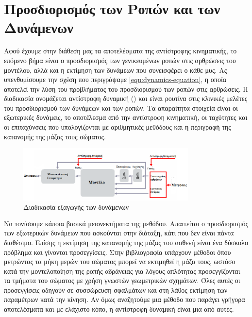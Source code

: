 \section{Προσδιορισμός των Ροπών και των Δυνάμενων}

Αφού έχουμε στην διάθεση μας τα αποτελέσματα της αντίστροφης κινηματικής, το επόμενο βήμα είναι ο προσδιορισμός των γενικευμένων ροπών στις αρθρώσεις του μοντέλου, αλλά και η εκτίμηση των δυνάμεων που συνεισφέρει ο κάθε μυς. Ας υπενθυμίσουμε την σχέση που περιγράψαμε \ref{equ:dynamics-equation}, η οποία αποτελεί την λύση του προβλήματος του προσδιορισμού των ροπών στις αρθρώσεις. Η διαδικασία ονομάζεται αντίστροφη δυναμική () και είναι ρουτίνα στις κλινικές μελέτες του προσδιορισμού των δυνάμεων και των ροπών. Τα απαραίτητα στοιχεία είναι οι εξωτερικές δυνάμεις, το αποτέλεσμα από την αντίστροφη κινηματική, οι ταχύτητες και οι επιταχύνσεις που υπολογίζονται με αριθμητικές μεθόδους και η περιγραφή της κατανομής της μάζας τους σώματος.

\begin{figure}[H]
    \centering
    \includegraphics[width=0.8\textwidth, keepaspectratio]{fig/process.png}
    \caption{Διαδικασία εξαγωγής των δυνάμενων\protect\footnotemark}
    \label{fig:methods-process1}
\end{figure}

Να τονίσουμε κάποια βασικά μειονεκτήματα της μεθόδου. Απαιτείται ο προσδιορισμός των εξωτερικών δυνάμεων που ασκούνται στην διάταξη, κάτι που δεν είναι πάντα διαθέσιμο. Επίσης η εκτίμηση της κατανομής της μάζας του ασθενή είναι ένα δύσκολο πρόβλημα και γίνονται προσεγγίσεις. Στην βιβλιογραφία υπάρχουν μέθοδοι όπου μετρώντας τα μήκη μερών του σώματος μπορεί να εκτιμηθεί η μάζα τους, ωστόσο κατά την μοντελοποίηση της ροπής αδράνειας για λόγους απλότητας προσεγγίζονται τα τμήματα του σώματος με χρήση γνωστών γεωμετρικών σχημάτων. Όλες αυτές οι προσεγγίσεις οδηγούν σε συσσώρευση σφαλμάτων και στη λάθος εκτίμηση των παραμέτρων κατά την κίνηση. Αν όμως αναζητούμε μια μέθοδο που παράγει γρήγορα αποτελέσματα και με ελάχιστο κόπο, η αντίστροφη δυναμική είναι μια από αυτές.

